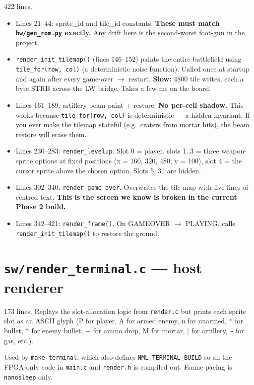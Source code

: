 \documentclass[11pt,letterpaper]{article}
\begin{document}
422 lines.

\begin{itemize}[leftmargin=*]
  \item Lines 21--44: sprite\_id and tile\_id constants. \textbf{These must
    match \texttt{hw/gen\_rom.py} exactly.} Any drift here is the
    second-worst foot-gun in the project.
  \item \texttt{render\_init\_tilemap()} (lines 146--152) paints the
    entire battlefield using \texttt{tile\_for(row, col)} (a deterministic
    noise function). Called once at startup and again after every
    game-over $\to$ restart. \textbf{Slow:} 4800 tile writes, each a
    byte STRB across the LW bridge. Takes a few ms on the board.
  \item Lines 161--189: artillery beam paint + restore. \textbf{No per-cell
    shadow.} This works because \texttt{tile\_for(row, col)} is
    deterministic --- a hidden invariant. If you ever make the tilemap
    stateful (e.g.\ craters from mortar hits), the beam restore will erase
    them.
  \item Lines 230--283: \texttt{render\_levelup}. Slot 0 = player, slots
    1..3 = three weapon-sprite options at fixed positions (x = 160, 320,
    480; y = 100), slot 4 = the cursor sprite above the chosen option.
    Slots 5..31 are hidden.
  \item Lines 302--340: \texttt{render\_game\_over}. Overwrites the tile
    map with five lines of centred text. \textbf{This is the screen we
    know is broken in the current Phase 2 build.}
  \item Lines 342--421: \texttt{render\_frame()}. On GAMEOVER $\to$
    PLAYING, calls \texttt{render\_init\_tilemap()} to restore the ground.
\end{itemize}

\section{\texttt{sw/render\_terminal.c} --- host renderer}

173 lines. Replays the slot-allocation logic from \texttt{render.c} but
prints each sprite slot as an ASCII glyph (P for player, A for armed
enemy, u for unarmed, * for bullet, \texttt{\^} for enemy bullet, + for
ammo drop, M for mortar, | for artillery, \texttt{\~} for gas, etc.).

Used by \texttt{make terminal}, which also defines
\texttt{NML\_TERMINAL\_BUILD} so all the FPGA-only code in \texttt{main.c}
and \texttt{render.h} is compiled out. Frame pacing is \texttt{nanosleep}
only.
\end{document}
